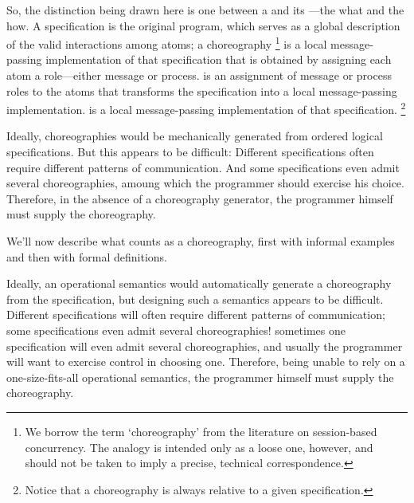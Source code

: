 \documentclass[
  class=../hdeyoung-proposal,
  crop=false
]{standalone}
\begin{document}
So, the distinction being drawn here is one between a  and its ---the what and the how.
A specification is the original program, which serves as a global description of the valid interactions among atoms; a choreography%
\footnote{We borrow the term \enquote*{choreography} from the literature on session-based concurrency.
The analogy is intended only as a loose one, however, and should not be taken to imply a precise, technical correspondence.}
is a local message-passing implementation of that specification that is obtained by assigning each atom a role---either message or process.
is an assignment of message or process roles to the atoms that transforms the specification into a local message-passing implementation.
is a local message-passing implementation of that specification.%
\footnote{Notice that a choreography is always relative to a given specification.}

Ideally, choreographies would be mechanically generated from ordered logical specifications.
But this appears to be difficult:
Different specifications often require different patterns of communication.
And some specifications even admit several choreographies, amoung which the programmer should exercise his choice.
Therefore, in the absence of a choreography generator, the programmer himself must supply the choreography.

We'll now describe what counts as a choreography, first with informal examples and then with formal definitions.


Ideally, an operational semantics would automatically generate a choreography from the specification, but designing such a semantics appears to be difficult.
Different specifications will often require different patterns of communication;
some specifications even admit several choreographies!
sometimes one specification will even admit several choreographies, and usually the programmer will want to exercise control in choosing one.
Therefore, being unable to rely on a one-size-fits-all operational semantics, the programmer himself must supply the choreography.
\end{document}
